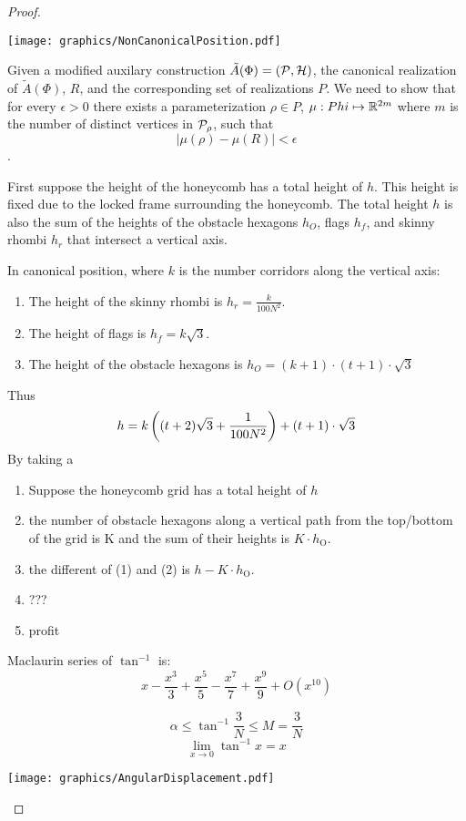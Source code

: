\begin{proof}
\begin{minipage}{\linewidth}
\begin{center}
\texttt{[image: graphics/NonCanonicalPosition.pdf]}
\end{center}
\end{minipage}


Given a modified auxilary construction $\tilde{A}(\Phi) = \left({\cal P},{\cal H}\right)$, the canonical realization of $\tilde{A}(\Phi)$, $R$, and the corresponding set of realizations $P$. 
We need to show that for every $\epsilon > 0$ there exists a parameterization $\rho \in P$, $\mu:Phi \mapsto {\mathbb{R}}^{2m}$ where $m$ is the number of distinct vertices in ${\cal P}_\rho$, such that $$\left\vert \mu (\rho) - \mu (R) \right\vert < \epsilon$$.

First suppose the height of the honeycomb has a total height of $h$.
This height is fixed due to the locked frame surrounding the honeycomb. 
The total height $h$ is also the sum of the heights of the obstacle hexagons $h_O$, flags $h_f$, and skinny rhombi $h_r$ that intersect a vertical axis. 

In canonical position, where $k$ is the number corridors along the vertical axis:
\begin{enumerate}
\item The height of the skinny rhombi is $h_r = \frac{k}{100 N^2}$. 
\item The height of flags is $h_f = k \sqrt{3}$.
\item The height of the obstacle hexagons is $h_O = (k+1) \cdot (t+1) \cdot \sqrt{3}$
\end{enumerate}
Thus $$h = k \left( (t+2) \sqrt{3} + \frac{1}{100 N^2} \right) + (t+1) \cdot \sqrt{3}$$
By taking a 
\begin{enumerate}
\item Suppose the honeycomb grid has a total height of $h$
\item the number of obstacle hexagons along a vertical path from the top/bottom of the grid is K and the sum of their heights is $K \cdot h_\text{O}$.  
\item the different of (1) and (2) is $h - K \cdot h_\text{O}$.
\item ???
\item profit
\end{enumerate}

Maclaurin series of $\tan^{-1}$ is:
$$x-\frac{x^3}{3}+\frac{x^5}{5}-\frac{x^7}{7}+\frac{x^9}{9}+O(x^{10})$$


$$\alpha \leq \tan^{-1} \frac{3}{N} \leq M = \frac{3}{N}$$
$$ \lim_{x\rightarrow 0} \tan^{-1} x = x$$

\begin{minipage}{\linewidth}
\begin{center}
\texttt{[image: graphics/AngularDisplacement.pdf]}
\end{center}
\end{minipage}



\end{proof}



